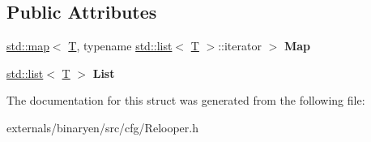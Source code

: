 \subsection*{Public Attributes}
\begin{DoxyCompactItemize}
\item 
\mbox{\label{struct_c_f_g_1_1_insert_ordered_set_a2b73b49f36bbfcef1f90ccf489734c71}} 
\mbox{\hyperlink{classstd_1_1map}{std\+::map}}$<$ \mbox{\hyperlink{struct_t}{T}}, typename \mbox{\hyperlink{classstd_1_1list}{std\+::list}}$<$ \mbox{\hyperlink{struct_t}{T}} $>$\+::iterator $>$ {\bfseries Map}
\item 
\mbox{\label{struct_c_f_g_1_1_insert_ordered_set_a28fc0f038de7972afabf04ba7101c579}} 
\mbox{\hyperlink{classstd_1_1list}{std\+::list}}$<$ \mbox{\hyperlink{struct_t}{T}} $>$ {\bfseries List}
\end{DoxyCompactItemize}


The documentation for this struct was generated from the following file\+:\begin{DoxyCompactItemize}
\item 
externals/binaryen/src/cfg/Relooper.\+h\end{DoxyCompactItemize}
